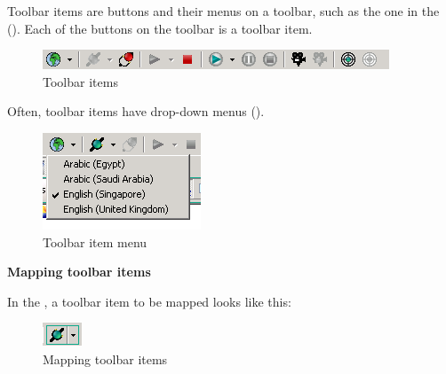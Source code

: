 
Toolbar items are buttons and their menus on a toolbar, such as the one in the \ite{} (). Each of the buttons on the toolbar is a toolbar item. 

\begin{figure}
\begin{center}
\includegraphics{PS/toolbar}
\caption{Toolbar items}
\label{toolbar}
\end{center}
\end{figure}

Often, toolbar items have drop-down menus ().
\begin{figure}
\begin{center}
\includegraphics{PS/toolbarmenu}
\caption{Toolbar item menu}
\label{toolbarmenu}
\end{center}
\end{figure}


\textbf{Mapping toolbar items}

In the \gdomm{}, a toolbar item to be mapped looks like this:

\begin{figure}
\begin{center}
\includegraphics{PS/maptoolbar}
\caption{Mapping toolbar items}
\label{maptoolbar}
\end{center}
\end{figure}
